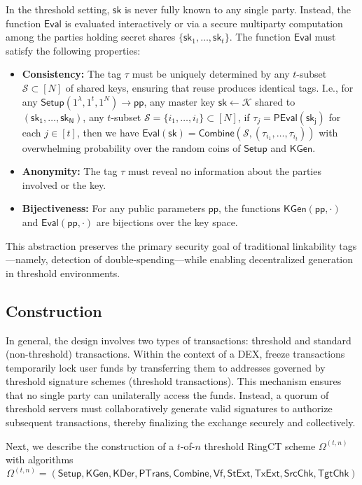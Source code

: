 In the threshold setting, $\mathsf{sk}$ is never fully known to any single party. Instead, the function $\mathsf{Eval}$ is evaluated interactively or via a secure multiparty computation among the parties holding secret shares $\{\mathsf{sk}_1, \ldots, \mathsf{sk}_t\}$. The function $\mathsf{Eval}$ must satisfy the following properties:
\begin{itemize}
    \item \textbf{Consistency:} The tag $\tau$ must be uniquely determined by any $t$-subset $\mathcal{S} \subset [N]$ of shared keys, ensuring that reuse produces identical tags. I.e., for any $ \mathsf{Setup} (1^\lambda, 1^t, 1^N) \to \mathsf{pp}$, any
master key $\mathsf{sk} \gets \mathcal{K}$ shared to $(\mathsf{sk_1}, \ldots, \mathsf{sk_N})$, any $t$-subset $\mathcal{S} = \{i_1, \ldots, i_t\} \subset [N]$, if $\tau_j = \mathsf{PEval}(\mathsf{sk_j})$ for each $j \in [t]$, then
we have $\mathsf{Eval}(\mathsf{sk}) = \mathsf{Combine}(\mathcal{S}, (\tau_{i_1}, \ldots, \tau_{i_t}))$ with overwhelming probability over the
random coins of $\mathsf{Setup}$ and $\mathsf{KGen}$. 
    \item \textbf{Anonymity:} The tag $\tau$ must reveal no information about the parties involved or the key.
    \item \textbf{Bijectiveness:} For any public parameters $\mathsf{pp}$, the functions $\mathsf{KGen(pp, \cdot)}$ and $\mathsf{Eval(pp, \cdot)}$ are bijections over the key space.
\end{itemize}

This abstraction preserves the primary security goal of traditional linkability tags—namely, detection of double-spending—while enabling decentralized generation in threshold environments.


\subsection{Construction}
In general, the design involves two types of transactions: threshold and standard (non-threshold) transactions. Within the context of a DEX, freeze transactions temporarily lock user funds by transferring them to addresses governed by threshold signature schemes (threshold transactions). This mechanism ensures that no single party can unilaterally access the funds. Instead, a quorum of threshold servers must collaboratively generate valid signatures to authorize subsequent transactions, thereby finalizing the exchange securely and collectively. 

Next, we describe the construction of a $t$-of-$n$ threshold RingCT scheme $\Omega^{(t,n)}$ with algorithms
\[
\Omega^{(t,n)} = (\mathsf{Setup}, \mathsf{KGen}, \mathsf{KDer}, \mathsf{PTrans}, \mathsf{Combine}, \mathsf{Vf}, \mathsf{StExt}, \mathsf{TxExt}, \mathsf{SrcChk}, \mathsf{TgtChk})
\] 

